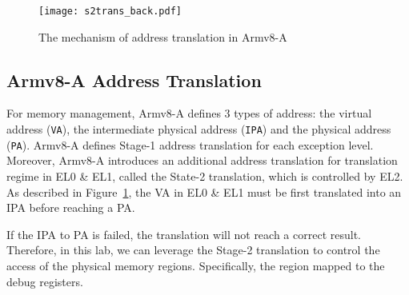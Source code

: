 \begin{figure}[htb]
	\centering
	\texttt{[image: s2trans\_back.pdf]}
	\caption{The mechanism of address translation in Armv8-A}
	\label{fig:armat}
\end{figure}

\subsection{Armv8-A Address Translation}

For memory management, Armv8-A defines 3 types of address: the virtual address (\texttt{VA}),
the intermediate physical address (\texttt{IPA}) and the physical address
(\texttt{PA}).
Armv8-A defines Stage-1 address translation for each exception level. 
Moreover, Armv8-A introduces an additional address translation for translation regime in EL0 \& EL1, called the State-2 translation, which is controlled by EL2.
As described in
Figure~\ref{fig:armat}, the VA in EL0 \& EL1 must be first translated into an IPA before reaching a PA.

If the IPA to PA is failed, the translation will not reach a correct result.
Therefore, in this lab, we can leverage the Stage-2 translation to control the access of the physical memory regions. Specifically, the region mapped to the debug registers.
